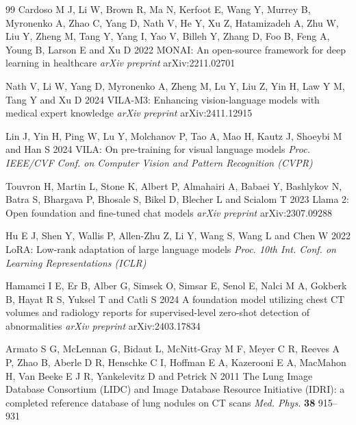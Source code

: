 \documentclass{iopconfser}
\begin{document}
\begin{thebibliography}{99}
Cardoso M J, Li W, Brown R, Ma N, Kerfoot E, Wang Y, Murrey B, Myronenko A,
Zhao C, Yang D, Nath V, He Y, Xu Z, Hatamizadeh A, Zhu W, Liu Y, Zheng M,
Tang Y, Yang I, Yao V, Billeh Y, Zhang D, Foo B, Feng A, Young B, Larson E
and Xu D 2022
MONAI: An open-source framework for deep learning in healthcare
\textit{arXiv preprint} arXiv:2211.02701

Nath V, Li W, Yang D, Myronenko A, Zheng M, Lu Y, Liu Z, Yin H, Law Y M,
Tang Y and Xu D 2024
VILA-M3: Enhancing vision-language models with medical expert knowledge
\textit{arXiv preprint} arXiv:2411.12915

Lin J, Yin H, Ping W, Lu Y, Molchanov P, Tao A, Mao H, Kautz J,
Shoeybi M and Han S 2024
VILA: On pre-training for visual language models
\textit{Proc. IEEE/CVF Conf. on Computer Vision and Pattern Recognition (CVPR)}

Touvron H, Martin L, Stone K, Albert P, Almahairi A, Babaei Y,
Bashlykov N, Batra S, Bhargava P, Bhosale S, Bikel D, Blecher L and
Scialom T 2023
Llama 2: Open foundation and fine-tuned chat models
\textit{arXiv preprint} arXiv:2307.09288

Hu E J, Shen Y, Wallis P, Allen-Zhu Z, Li Y, Wang S, Wang L and Chen W 2022
LoRA: Low-rank adaptation of large language models
\textit{Proc. 10th Int. Conf. on Learning Representations (ICLR)}

Hamamci I E, Er B, Alber G, Simsek O, Simsar E, Senol E, Nalci M A,
Gokberk B, Hayat R S, Yuksel T and Catli S 2024
A foundation model utilizing chest CT volumes and radiology reports for
supervised-level zero-shot detection of abnormalities
\textit{arXiv preprint} arXiv:2403.17834

Armato S G, McLennan G, Bidaut L, McNitt-Gray M F, Meyer C R, Reeves A P,
Zhao B, Aberle D R, Henschke C I, Hoffman E A, Kazerooni E A, MacMahon H,
Van Beeke E J R, Yankelevitz D and Petrick N 2011
The Lung Image Database Consortium (LIDC) and Image Database Resource
Initiative (IDRI): a completed reference database of lung nodules on CT scans
\textit{Med. Phys.} \textbf{38} 915--931

\end{thebibliography}
\end{document}
